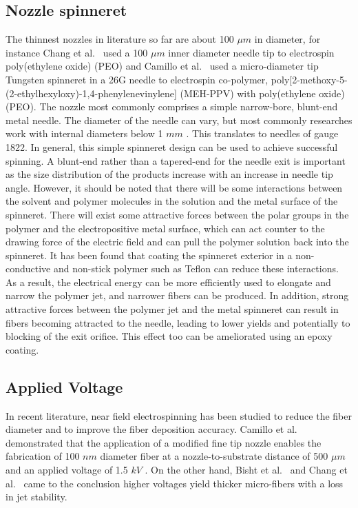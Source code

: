 \documentclass[5p,,preprint,12pt,twocolumn]{elsarticle}
\begin{document}
\subsection{Nozzle spinneret}The thinnest nozzles in literature so far are about 100 $\mu m $ in diameter, for instance Chang et al.\unskip~\cite{527120:11974306} used a 100 $\mu m $ inner diameter needle tip to electrospin poly(ethylene oxide) (PEO) and Camillo et al.\unskip~\cite{527120:12322072} used a micro-diameter tip Tungsten spinneret in a 26G needle to electrospin co-polymer, poly[2-methoxy-5-(2-ethylhexyloxy)-1,4-phenylenevinylene] (MEH-PPV) with poly(ethylene oxide) (PEO). The nozzle most commonly comprises a simple narrow-bore, blunt-end metal needle. The diameter of the needle can vary, but most commonly researches work with internal diameters below 1 $mm $ . This translates to needles of gauge 18{\textendash}22. In general, this simple spinneret design can be used to achieve successful spinning. A blunt-end rather than a tapered-end for the needle exit is important as the size distribution of the products increase with an increase in needle tip angle. However, it should be noted that there will be some interactions between the solvent and polymer molecules in the solution and the metal surface of the spinneret. There will exist some attractive forces between the polar groups in the polymer and the electropositive metal surface, which can act counter to the drawing force of the electric field and can pull the polymer solution back into the spinneret. It has been found that coating the spinneret exterior in a non-conductive and non-stick polymer such as Teflon can reduce these interactions.\unskip~\cite{527120:13082768} As a result, the electrical energy can be more efficiently used to elongate and narrow the polymer jet, and narrower fibers can be produced. In addition, strong attractive forces between the polymer jet and the metal spinneret can result in fibers becoming attracted to the needle, leading to lower yields and potentially to blocking of the exit orifice. This effect too can be ameliorated using an epoxy coating.\unskip~\cite{527120:13082811}



\subsection{Applied Voltage}In recent literature, near field electrospinning has been studied to reduce the fiber diameter and to improve the fiber deposition accuracy. Camillo et al.\unskip~\cite{527120:12322072} demonstrated that the application of a modified fine tip nozzle enables the fabrication of 100 $nm $ diameter fiber at a nozzle-to-substrate distance of 500 $\mu m $ and an applied voltage of 1.5 $kV $ . On the other hand, Bisht et al.\unskip~\cite{527120:11973130} and Chang et al.\unskip~\cite{527120:11974306} came to the conclusion higher voltages yield thicker micro-fibers with a loss in jet stability.
\end{document}
